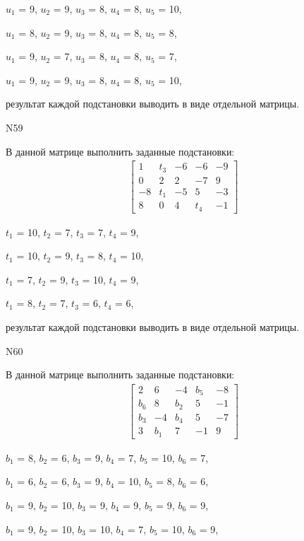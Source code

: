\documentclass[11pt]{report}
\begin{document}
$u_{1}$ = 9, $u_{2}$ = 9, $u_{3}$ = 8, $u_{4}$ = 8, $u_{5}$ = 10, 

$u_{1}$ = 8, $u_{2}$ = 9, $u_{3}$ = 8, $u_{4}$ = 8, $u_{5}$ = 8, 

$u_{1}$ = 9, $u_{2}$ = 7, $u_{3}$ = 8, $u_{4}$ = 8, $u_{5}$ = 7, 

$u_{1}$ = 9, $u_{2}$ = 9, $u_{3}$ = 8, $u_{4}$ = 8, $u_{5}$ = 10, 

результат каждой подстановки выводить в виде отдельной матрицы.

N59

В данной матрице выполнить заданные подстановки:
\begin{align*}
\left[\begin{matrix}1 & t_{3} & -6 & -6 & -9\\0 & 2 & 2 & -7 & 9\\-8 & t_{1} & -5 & 5 & -3\\8 & 0 & 4 & t_{4} & -1\end{matrix}\right]
\end{align*}


$t_{1}$ = 10, $t_{2}$ = 7, $t_{3}$ = 7, $t_{4}$ = 9, 

$t_{1}$ = 10, $t_{2}$ = 9, $t_{3}$ = 8, $t_{4}$ = 10, 

$t_{1}$ = 7, $t_{2}$ = 9, $t_{3}$ = 10, $t_{4}$ = 9, 

$t_{1}$ = 8, $t_{2}$ = 7, $t_{3}$ = 6, $t_{4}$ = 6, 

результат каждой подстановки выводить в виде отдельной матрицы.

N60

В данной матрице выполнить заданные подстановки:
\begin{align*}
\left[\begin{matrix}2 & 6 & -4 & b_{5} & -8\\b_{6} & 8 & b_{2} & 5 & -1\\b_{3} & -4 & b_{4} & 5 & -7\\3 & b_{1} & 7 & -1 & 9\end{matrix}\right]
\end{align*}


$b_{1}$ = 8, $b_{2}$ = 6, $b_{3}$ = 9, $b_{4}$ = 7, $b_{5}$ = 10, $b_{6}$ = 7, 

$b_{1}$ = 6, $b_{2}$ = 6, $b_{3}$ = 9, $b_{4}$ = 10, $b_{5}$ = 8, $b_{6}$ = 6, 

$b_{1}$ = 9, $b_{2}$ = 10, $b_{3}$ = 9, $b_{4}$ = 9, $b_{5}$ = 9, $b_{6}$ = 9, 

$b_{1}$ = 9, $b_{2}$ = 10, $b_{3}$ = 10, $b_{4}$ = 7, $b_{5}$ = 10, $b_{6}$ = 9, 
\end{document}
